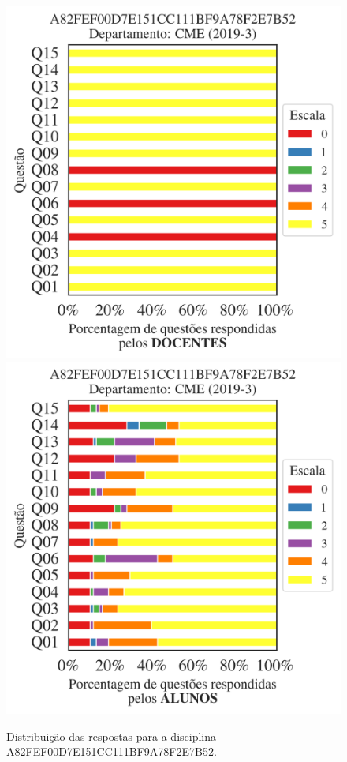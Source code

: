 \documentclass[a4paper,10pt]{article}
\begin{document}
\begin{figure}[h]
\centering
\includegraphics[width=0.485\linewidth]{analise_disciplina_departamento_CME_A82FEF00D7E151CC111BF9A78F2E7B52_docentes.png}
\includegraphics[width=0.485\linewidth]{analise_disciplina_departamento_CME_A82FEF00D7E151CC111BF9A78F2E7B52_alunos.png}
\caption{\label{fig:analise_geral_departamento}                Distribuição das respostas para a disciplina A82FEF00D7E151CC111BF9A78F2E7B52. }
\end{figure}
\end{document}
